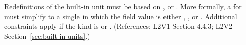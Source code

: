Redefinitions of the built-in unit  must be based on
,  or .  More formally, a
\UnitDefinition for  must simplify to a single \Unit in which
the  field value is either , , or
.  Additional constraints apply if the kind is
 or .  (References: L2V1 Section 4.4.3; L2V2
Section~\ref{sec:built-in-units}.)
